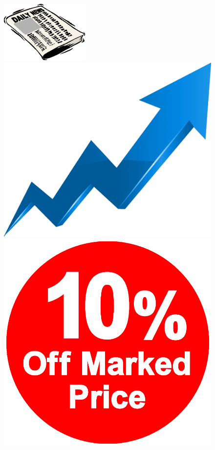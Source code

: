 \documentclass[document.tex]{subfiles}
\begin{document}
\begin{figure}[H]
	\begin{multicols}{4}[\columnsep=2.0cm]
		\includegraphics[scale=0.55]{imgs/news.png}
		\columnbreak
		
		\includegraphics[scale=0.15]{imgs/stock.png}
		\columnbreak
		
		\includegraphics[scale=0.092]{imgs/product_prices.png}
		\columnbreak
		

\end{multicols}
\end{figure}
\end{document}
